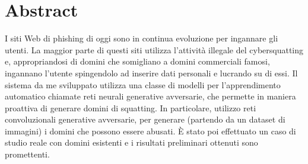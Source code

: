 \chapter*{Abstract}

I siti Web di phishing di oggi sono in continua evoluzione per ingannare gli utenti. La maggior parte di questi siti utilizza l’attività illegale del cybersquatting e, appropriandosi di domini che somigliano a domini commerciali famosi, ingannano l’utente spingendolo ad inserire dati personali e lucrando su di essi. Il sistema da me sviluppato utilizza una classe di modelli per l’apprendimento automatico chiamate reti neurali generative avversarie, che permette in maniera proattiva di generare domini di squatting. In particolare, utilizzo reti convoluzionali generative avversarie, per generare (partendo da un dataset di immagini) i domini che possono essere abusati. È stato poi effettuato un caso di studio reale con domini esistenti e i risultati preliminari ottenuti sono promettenti.

